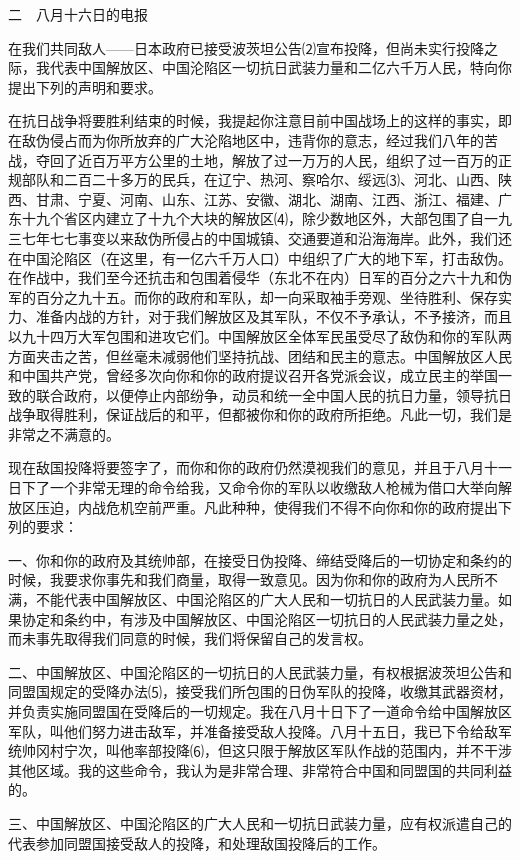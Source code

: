 \documentclass[UTF-8, a5paper, 12pt]{ctexart}
\begin{document}
二　八月十六日的电报

在我们共同敌人——日本政府已接受波茨坦公告⑵宣布投降，但尚未实行投降之际，我代表中国解放区、中国沦陷区一切抗日武装力量和二亿六千万人民，特向你提出下列的声明和要求。

在抗日战争将要胜利结束的时候，我提起你注意目前中国战场上的这样的事实，即在敌伪侵占而为你所放弃的广大沦陷地区中，违背你的意志，经过我们八年的苦战，夺回了近百万平方公里的土地，解放了过一万万的人民，组织了过一百万的正规部队和二百二十多万的民兵，在辽宁、热河、察哈尔、绥远⑶、河北、山西、陕西、甘肃、宁夏、河南、山东、江苏、安徽、湖北、湖南、江西、浙江、福建、广东十九个省区内建立了十九个大块的解放区⑷，除少数地区外，大部包围了自一九三七年七七事变以来敌伪所侵占的中国城镇、交通要道和沿海海岸。此外，我们还在中国沦陷区（在这里，有一亿六千万人口）中组织了广大的地下军，打击敌伪。在作战中，我们至今还抗击和包围着侵华（东北不在内）日军的百分之六十九和伪军的百分之九十五。而你的政府和军队，却一向采取袖手旁观、坐待胜利、保存实力、准备内战的方针，对于我们解放区及其军队，不仅不予承认，不予接济，而且以九十四万大军包围和进攻它们。中国解放区全体军民虽受尽了敌伪和你的军队两方面夹击之苦，但丝毫未减弱他们坚持抗战、团结和民主的意志。中国解放区人民和中国共产党，曾经多次向你和你的政府提议召开各党派会议，成立民主的举国一致的联合政府，以便停止内部纷争，动员和统一全中国人民的抗日力量，领导抗日战争取得胜利，保证战后的和平，但都被你和你的政府所拒绝。凡此一切，我们是非常之不满意的。

现在敌国投降将要签字了，而你和你的政府仍然漠视我们的意见，并且于八月十一日下了一个非常无理的命令给我，又命令你的军队以收缴敌人枪械为借口大举向解放区压迫，内战危机空前严重。凡此种种，使得我们不得不向你和你的政府提出下列的要求：

一、你和你的政府及其统帅部，在接受日伪投降、缔结受降后的一切协定和条约的时候，我要求你事先和我们商量，取得一致意见。因为你和你的政府为人民所不满，不能代表中国解放区、中国沦陷区的广大人民和一切抗日的人民武装力量。如果协定和条约中，有涉及中国解放区、中国沦陷区一切抗日的人民武装力量之处，而未事先取得我们同意的时候，我们将保留自己的发言权。

二、中国解放区、中国沦陷区的一切抗日的人民武装力量，有权根据波茨坦公告和同盟国规定的受降办法⑸，接受我们所包围的日伪军队的投降，收缴其武器资材，并负责实施同盟国在受降后的一切规定。我在八月十日下了一道命令给中国解放区军队，叫他们努力进击敌军，并准备接受敌人投降。八月十五日，我已下令给敌军统帅冈村宁次，叫他率部投降⑹，但这只限于解放区军队作战的范围内，并不干涉其他区域。我的这些命令，我认为是非常合理、非常符合中国和同盟国的共同利益的。

三、中国解放区、中国沦陷区的广大人民和一切抗日武装力量，应有权派遣自己的代表参加同盟国接受敌人的投降，和处理敌国投降后的工作。
\end{document}
